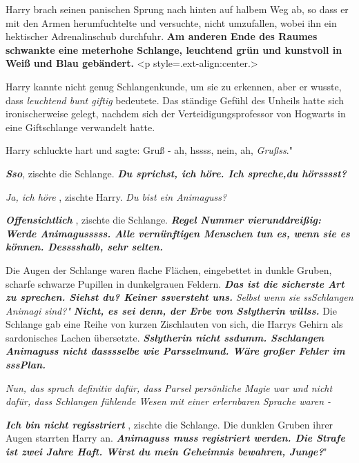 Harry brach seinen panischen Sprung nach hinten auf halbem Weg ab, so dass er
mit den Armen herumfuchtelte und versuchte, nicht umzufallen, wobei ihn ein
hektischer Adrenalinschub durchfuhr.
\textbf{ Am anderen Ende des Raumes schwankte eine meterhohe Schlange, leuchtend
grün und kunstvoll in Weiß und Blau gebändert.}  <p
style=\grqq{}.ext-align:center\grqq{}.>

Harry kannte nicht genug Schlangenkunde, um sie zu erkennen, aber er wusste,
dass \emph{ \glqq{}leuchtend bunt\grqq{} \glqq{}giftig\grqq{}} bedeutete. Das
ständige Gefühl des Unheils hatte sich ironischerweise gelegt, nachdem sich der
Verteidigungsprofessor von Hogwarts in eine Giftschlange verwandelt hatte.

Harry schluckte hart und sagte: \glqq{}Gruß - ah, hssss, nein, ah,
\emph{Grußss}."

\glqq{}\textbf{\emph{Sso}}\grqq{}, zischte die Schlange. \textbf{\emph{\glqq{}Du
sprichst, ich höre. Ich spreche,du hörsssst?\grqq{}} }

\emph{\glqq{}Ja, ich höre\grqq{}} , zischte Harry. \emph{\glqq{}Du bist ein
Animaguss?\grqq{}}

\textbf{\emph{ \glqq{}Offensichtlich\grqq{}} }, zischte die Schlange.
\textbf{\emph{ \glqq{}Regel Nummer vierunddreißig: Werde Animagusssss. Alle
vernünftigen Menschen tun es, wenn sie es können. Desssshalb, sehr
selten.\grqq{}} }

Die Augen der Schlange waren flache Flächen, eingebettet in dunkle Gruben,
scharfe schwarze Pupillen in dunkelgrauen Feldern. \textbf{\emph{ \glqq{}Das ist
die sicherste Art zu sprechen. Siehst du? Keiner ssversteht uns.\grqq{}} }
\emph{\glqq{}Selbst wenn sie ssSchlangen Animagi sind?"} \textbf{\emph{ \glqq
Nicht, es sei denn, der Erbe von Sslytherin willss.\grqq{}} } Die Schlange gab
eine Reihe von kurzen Zischlauten von sich, die Harrys Gehirn als sardonisches
Lachen übersetzte. \textbf{\emph{ \glqq{}Sslytherin nicht ssdumm. Sschlangen
Animaguss nicht dasssselbe wie Parsselmund. Wäre großer Fehler im
sssPlan.\grqq{}} }

\emph{Nun, das sprach definitiv dafür, dass Parsel persönliche Magie war und
nicht dafür, dass Schlangen fühlende Wesen mit einer erlernbaren Sprache
waren -}

\textbf{\emph{ \glqq{}Ich bin nicht regisstriert\grqq{}} }, zischte die Schlange.
Die dunklen Gruben ihrer Augen starrten Harry an. \textbf{\emph{ \glqq{}Animaguss
muss registriert werden. Die Strafe ist zwei Jahre Haft. Wirst du mein Geheimnis
bewahren, Junge?}}"

